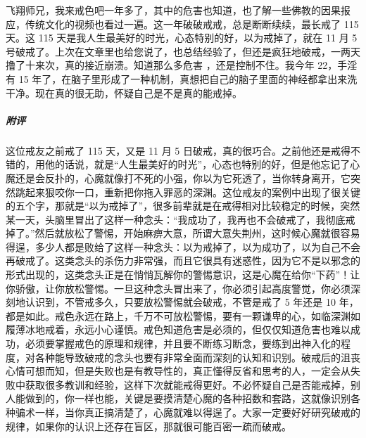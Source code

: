\begin{case}
    飞翔师兄，我来戒色吧一年多了，其中的危害也知道，也了解一些佛教的因果报应，传统文化的视频也看过一遍。这一年破破戒戒，总是断断续续，最长戒了 115 天。这 115 天是我人生最美好的时光，心态特别的好，以为戒掉了，就在 11 月 5 号破戒了。上次在文章里也给您说了，也总结经验了，但还是疯狂地破戒，一两天撸了十来次，真的接近崩溃。知道那么多危害 ，还是控制不住。我今年 22，手淫有 15 年了，在脑子里形成了一种机制，真想把自己的脑子里面的神经都拿出来洗干净。现在真的很无助，怀疑自己是不是真的能戒掉。
    \subparagraph{附评} 这位戒友之前戒了 115 天，又是 11 月 5 日破戒，真的很巧合。之前他还是戒得不错的，用他的话说，就是“人生最美好的时光”，心态也特别的好，但是他忘记了心魔还是会反扑的，心魔就像打不死的小强，你以为它死透了，当你转身离开，它突然跳起来狠咬你一口，重新把你拖入罪恶的深渊。这位戒友的案例中出现了很关键的五个字，那就是“以为戒掉了”，很多前辈就是在戒得相对比较稳定的时候，突然某一天，头脑里冒出了这样一种念头：“我成功了，我再也不会破戒了，我彻底戒掉了。”然后就放松了警惕，开始麻痹大意，所谓大意失荆州，这时候心魔就很容易得逞，多少人都是败给了这样一种念头：以为戒掉了，以为成功了，以为自己不会再破戒了。这类念头的杀伤力非常强，而且它很具有迷惑性，因为它不是以邪念的形式出现的，这类念头正是在悄悄瓦解你的警惕意识，这是心魔在给你“下药”！让你骄傲，让你放松警惕。一旦这种念头冒出来了，你必须引起高度警觉，你必须深刻地认识到，不管戒多久，只要放松警惕就会破戒，不管是戒了 5 年还是 10 年，都是如此。戒色永远在路上，千万不可放松警惕，要有一颗谦卑的心，如临深渊如履薄冰地戒着，永远小心谨慎。戒色知道危害是必须的，但仅仅知道危害也难以成功，必须要掌握戒色的原理和规律，并且要不断练习断念，要练到出神入化的程度，对各种能导致破戒的念头也要有非常全面而深刻的认知和识别。破戒后的沮丧心情可想而知，但是失败也是有教导性的，真正懂得反省和思考的人，一定会从失败中获取很多教训和经验，这样下次就能戒得更好。不必怀疑自己是否能戒掉，别人能做到的，你一样也能，关键是要摸清楚心魔的各种招数和套路，这就像识别各种骗术一样，当你真正搞清楚了，心魔就难以得逞了。大家一定要好好研究破戒的规律，如果你的认识上还存在盲区，那就很可能百密一疏而破戒。
\end{case}

